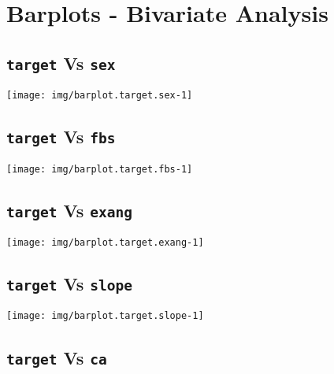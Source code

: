 \documentclass[]{article}
\begin{document}
\hypertarget{barplots}{%
\section{Barplots - Bivariate Analysis}\label{barplots}}

\hypertarget{target-vs-sex}{%
\subsection{\texorpdfstring{\texttt{target} Vs
\texttt{sex}}{target Vs sex}}\label{target-vs-sex}}

\begin{center}\texttt{[image: img/barplot.target.sex-1]} \end{center}

\hypertarget{target-vs-fbs}{%
\subsection{\texorpdfstring{\texttt{target} Vs
\texttt{fbs}}{target Vs fbs}}\label{target-vs-fbs}}

\begin{center}\texttt{[image: img/barplot.target.fbs-1]} \end{center}

\hypertarget{target-vs-exang}{%
\subsection{\texorpdfstring{\texttt{target} Vs
\texttt{exang}}{target Vs exang}}\label{target-vs-exang}}

\begin{center}\texttt{[image: img/barplot.target.exang-1]} \end{center}

\hypertarget{target-vs-slope}{%
\subsection{\texorpdfstring{\texttt{target} Vs
\texttt{slope}}{target Vs slope}}\label{target-vs-slope}}

\begin{center}\texttt{[image: img/barplot.target.slope-1]} \end{center}

\hypertarget{target-vs-ca}{%
\subsection{\texorpdfstring{\texttt{target} Vs
\texttt{ca}}{target Vs ca}}\label{target-vs-ca}}
\end{document}
